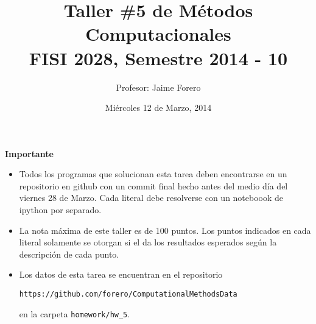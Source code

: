\documentclass{article}
\title{Taller \#5 de M\'etodos Computacionales\\ FISI 2028, Semestre 2014 - 10}
\author{Profesor: Jaime Forero}
\date{Mi\'ercoles 12 de Marzo, 2014}
\begin{document}
\maketitle
\thispagestyle{empty}


{\bf Importante}
\begin{itemize}

\item Todos los programas que solucionan esta tarea deben encontrarse
  en un repositorio en github con un commit final hecho antes del
  medio d\'ia del viernes 28 de Marzo. Cada literal debe resolverse
  con un noteboook de ipython por separado. 

\item La nota m\'axima de este taller es de 100 puntos. Los puntos indicados
  en cada literal solamente se otorgan si el da los resultados
  esperados seg\'un la descripci\'on de cada punto. 
 

 \item Los datos de esta tarea se encuentran en el repositorio


\verb"https://github.com/forero/ComputationalMethodsData" 

en la carpeta \verb"homework/hw_5".

\end{itemize}
\end{document}
